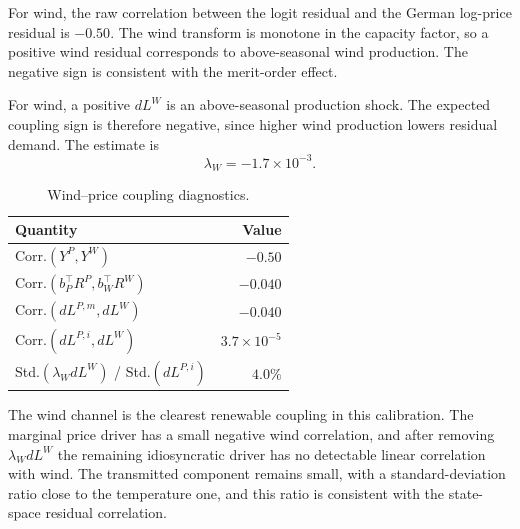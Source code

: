 For wind, the raw correlation between the logit residual and the German
log-price residual is \(-0.50\). The wind transform is monotone in the capacity
factor, so a positive wind residual corresponds to above-seasonal wind
production. The negative sign is consistent with the merit-order effect.

For wind, a positive \(dL^W\) is an above-seasonal production shock. The expected
coupling sign is therefore negative, since higher wind production lowers
residual demand. The estimate is
\[
  \lambda_W = -1.7\times 10^{-3}.
\]

\begin{table}[H]
  \centering
  \caption{Wind--price coupling diagnostics.}
  \label{tab:wind-price-coupling-diagnostics}
  \begin{tabular}{@{}lr@{}}
    \toprule
    Quantity & Value \\
    \midrule
    Corr.\((Y^P,Y^W)\) & \(-0.50\) \\
    Corr.\((b_P^\top R^P,b_W^\top R^W)\) & \(-0.040\) \\
    Corr.\((dL^{P,m},dL^W)\) & \(-0.040\) \\
    Corr.\((dL^{P,i},dL^W)\) & \(3.7{\times}10^{-5}\) \\
    Std.\((\lambda_W dL^W)\) / Std.\((dL^{P,i})\) & \(4.0\%\) \\
    \bottomrule
  \end{tabular}
\end{table}

The wind channel is the clearest renewable coupling in this calibration. The
marginal price driver has a small negative wind correlation, and after removing
\(\lambda_W dL^W\) the remaining idiosyncratic driver has no detectable
linear correlation with wind. The transmitted component remains small, with a
standard-deviation ratio close to the temperature one, and this ratio is
consistent with the state-space residual correlation.

\FloatBarrier
